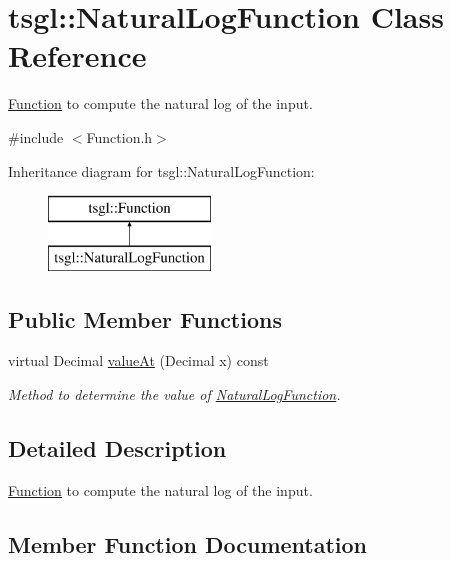 \hypertarget{classtsgl_1_1_natural_log_function}{}\section{tsgl\+:\+:Natural\+Log\+Function Class Reference}
\label{classtsgl_1_1_natural_log_function}


\hyperlink{classtsgl_1_1_function}{Function} to compute the natural log of the input.  




{\ttfamily \#include $<$Function.\+h$>$}

Inheritance diagram for tsgl\+:\+:Natural\+Log\+Function\+:\begin{figure}[H]
\begin{center}
\leavevmode
\includegraphics[height=2.000000cm]{classtsgl_1_1_natural_log_function}
\end{center}
\end{figure}
\subsection*{Public Member Functions}
\begin{DoxyCompactItemize}
\item 
virtual Decimal \hyperlink{classtsgl_1_1_natural_log_function_a27894f0360a0f89cf01126781a36e500}{value\+At} (Decimal x) const
\begin{DoxyCompactList}\small\item\em Method to determine the value of \hyperlink{classtsgl_1_1_natural_log_function}{Natural\+Log\+Function}. \end{DoxyCompactList}\end{DoxyCompactItemize}


\subsection{Detailed Description}
\hyperlink{classtsgl_1_1_function}{Function} to compute the natural log of the input. 

\subsection{Member Function Documentation}
\mbox{\label{classtsgl_1_1_natural_log_function_a27894f0360a0f89cf01126781a36e500}} 
